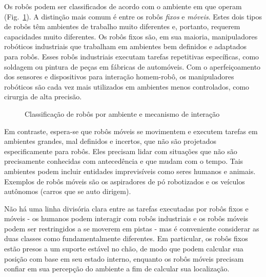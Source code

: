 Os robôs podem ser classificados de acordo com o ambiente em que operam (Fig.~\ref{fig.classification1}). A distinção mais comum é entre os robôs \emph{fixos} e \emph{móveis}. Estes dois tipos de robôs têm ambientes de trabalho muito diferentes e, portanto, requerem capacidades muito diferentes. Os robôs fixos são, em sua maioria, manipuladores robóticos industriais que trabalham em ambientes bem definidos e adaptados para robôs. Esses robôs industriais executam tarefas repetitivas específicas, como soldagem ou pintura de peças em fábricas de automóveis. Com o aperfeiçoamento dos sensores e dispositivos para interação homem-robô, os manipuladores robóticos são cada vez mais utilizados em ambientes menos controlados, como cirurgia de alta precisão.

\begin{figure}
\begin{center}
\end{center}
\caption{Classificação de robôs por ambiente e mecanismo de interação}\label{fig.classification1}
\end{figure}

Em contraste, espera-se que robôs móveis se movimentem e executem tarefas em ambientes grandes, mal definidos e incertos, que não são projetados especificamente para robôs. Eles precisam lidar com situações que não são precisamente conhecidas com antecedência e que mudam com o tempo. Tais ambientes podem incluir entidades imprevisíveis como seres humanos e animais. Exemplos de robôs móveis são os aspiradores de pó robotizados e os veículos autônomos (carros que se auto dirigem). 

Não há uma linha divisória clara entre as tarefas executadas por robôs fixos e móveis - os humanos podem interagir com robôs industriais e os robôs móveis podem ser restringidos a se moverem em pistas - mas é conveniente considerar as duas classes como fundamentalmente diferentes. Em particular, os robôs fixos estão presos a um suporte estável no chão, de modo que podem calcular sua posição com base em seu estado interno, enquanto os robôs móveis precisam confiar em sua percepção do ambiente a fim de calcular sua localização.

